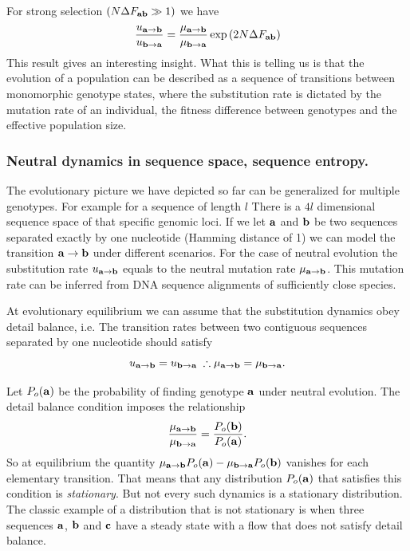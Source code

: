 For strong selection $(N \Delta F_{\mathbf{ab}} \gg 1)$ we have
\begin{equation}
  {u_{\mathbf{a} \rightarrow \mathbf{b}}\over u_{\mathbf{b} \rightarrow \mathbf{a}}} = {\mu_{\mathbf{a} \rightarrow \mathbf{b}} \over \mu_{\mathbf{b} \rightarrow \mathbf{a}}}
  \exp \left( 2 N \Delta F_{\mathbf{ab}} \right)
\end{equation}
This result gives an interesting insight. What this is telling us is that the
evolution of a population can be described as a sequence of transitions between
monomorphic genotype states, where the substitution rate is dictated by the
mutation rate of an individual, the fitness difference between genotypes and the
effective population size.

\subsubsection{Neutral dynamics in sequence space, sequence entropy.}

The evolutionary picture we have depicted so far can be generalized for multiple
genotypes. For example for a sequence of length $l$ There is a $4l$	dimensional
sequence space of that specific genomic loci. If we let $\mathbf{a}$ and $\mathbf{b}$ be
two sequences separated exactly by one nucleotide (Hamming distance of 1) we can
model the transition $\mathbf{a} \rightarrow \mathbf{b}$ under different scenarios. For
the case of neutral evolution the substitution rate $u_{\mathbf{a} \rightarrow \mathbf{b}}$ equals to the
neutral mutation rate $\mu_{\mathbf{a} \rightarrow \mathbf{b}}$. This mutation rate can be inferred from DNA
sequence alignments of sufficiently close species.

At evolutionary equilibrium we can assume that the substitution dynamics obey
detail balance, i.e. The transition rates between two contiguous sequences
separated by one nucleotide should satisfy
\begin{equation}
  u_{\mathbf{a} \rightarrow \mathbf{b}} = u_{\mathbf{b} \rightarrow \mathbf{a}} \; \therefore \mu_{\mathbf{a} \rightarrow \mathbf{b}} = \mu_{\mathbf{b} \rightarrow \mathbf{a}}.
\end{equation}

Let $P_o(\mathbf{a})$ be the probability of finding genotype $\mathbf{a}$ under neutral
evolution. The detail balance condition imposes the relationship
\begin{equation}
  {\mu_{\mathbf{a} \rightarrow \mathbf{b}}\over \mu_{\mathbf{b} \rightarrow \mathbf{a}}} = {P_o(\mathbf{b}) \over P_o(\mathbf{a})}.
\end{equation}
So at equilibrium the quantity $\mu_{\mathbf{a} \rightarrow \mathbf{b}} P_o(\mathbf{a}) - \mu_{\mathbf{b} \rightarrow \mathbf{a}} P_o(\mathbf{b})$
vanishes for each elementary transition. That means that any distribution
$P_o(\mathbf{a})$ that satisfies this condition is {\it stationary}. But not every
such dynamics is a stationary distribution. The classic example of a
distribution that is not stationary is when three sequences $\mathbf{a}$, $\mathbf{b}$
and $\mathbf{c}$ have a steady state with a flow that does not satisfy detail
balance.


